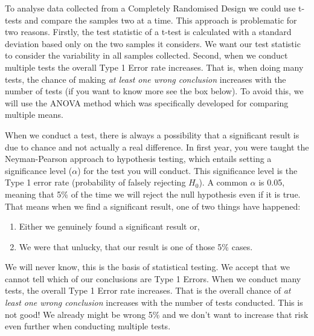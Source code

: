 \documentclass[
  letterpaper,
  DIV=11,
  numbers=noendperiod,
  oneside]{scrreprt}
\providecommand{\tightlist}{%
  \setlength{\itemsep}{0pt}\setlength{\parskip}{0pt}}\usepackage{longtable,booktabs,array}
\begin{document}
To analyse data collected from a Completely Randomised Design we could
use t-tests and compare the samples two at a time. This approach is
problematic for two reasons. Firstly, the test statistic of a t-test is
calculated with a standard deviation based only on the two samples it
considers. We want our test statistic to consider the variability in all
samples collected. Second, when we conduct multiple tests the overall
Type 1 Error rate increases. That is, when doing many tests, the chance
of making \emph{at least one wrong conclusion} increases with the number
of tests (if you want to know more see the box below). To avoid this, we
will use the ANOVA method which was specifically developed for comparing
multiple means.

\begin{tcolorbox}[enhanced jigsaw, toprule=.15mm, colbacktitle=quarto-callout-caution-color!10!white, toptitle=1mm, left=2mm, colframe=quarto-callout-caution-color-frame, bottomrule=.15mm, titlerule=0mm, breakable, opacitybacktitle=0.6, colback=white, coltitle=black, opacityback=0, bottomtitle=1mm, title={Multiple Testing / Comparisons}, rightrule=.15mm, arc=.35mm, leftrule=.75mm]

When we conduct a test, there is always a possibility that a significant
result is due to chance and not actually a real difference. In first
year, you were taught the Neyman-Pearson approach to hypothesis testing,
which entails setting a significance level (\(\alpha\)) for the test you
will conduct. This significance level is the Type 1 error rate
(probability of falsely rejecting \(H_0\)). A common \(\alpha\) is 0.05,
meaning that 5\% of the time we will reject the null hypothesis even if
it is true. That means when we find a significant result, one of two
things have happened:

\begin{enumerate}
\def\labelenumi{\arabic{enumi}.}
\tightlist
\item
  Either we genuinely found a significant result or,
\item
  We were that unlucky, that our result is one of those 5\% cases.
\end{enumerate}

We will never know, this is the basis of statistical testing. We accept
that we cannot tell which of our conclusions are Type 1 Errors. When we
conduct many tests, the overall Type 1 Error rate increases. That is the
overall chance of \emph{at least one wrong conclusion} increases with
the number of tests conducted. This is not good! We already might be
wrong 5\% and we don't want to increase that risk even further when
conducting multiple tests.

\end{tcolorbox}
\end{document}
